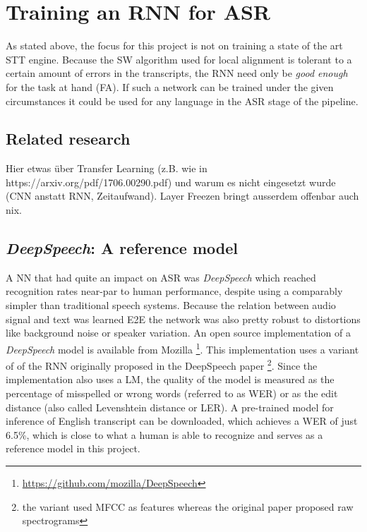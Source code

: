\section{Training an \ac{RNN} for \ac{ASR}}\label{ds}
As stated above, the focus for this project is not on training a state of the art \ac{STT} engine. Because the \ac{SW} algorithm used for local alignment is tolerant to a certain amount of errors in the transcripts, the \ac{RNN} need only be \textit{good enough} for the task at hand (\ac{FA}). If such a network can be trained under the given circumstances it could be used for any language in the \ac{ASR} stage of the pipeline. 

\subsection{Related research}

Hier etwas über Transfer Learning (z.B. wie in https://arxiv.org/pdf/1706.00290.pdf) und warum es nicht eingesetzt wurde (CNN anstatt RNN, Zeitaufwand). Layer Freezen bringt ausserdem offenbar auch nix. \parencite{budget}

\subsection{\textit{DeepSpeech}: A reference model}

A \ac{NN} that had quite an impact on \ac{ASR} was \textit{DeepSpeech} \parencite{deepspeech} which reached recognition rates near-par to human performance, despite using a comparably simpler than traditional speech systems. Because the relation between audio signal and text was learned \ac{E2E} the network was also pretty robust to distortions like background noise or speaker variation. An open source implementation of a \textit{DeepSpeech} model is available from Mozilla \footnote{\url{https://github.com/mozilla/DeepSpeech}}. This implementation uses a variant of of the \ac{RNN} originally proposed in the DeepSpeech paper \parencite{ctc_paper}\footnote{the variant used \ac{MFCC} as features whereas the original paper proposed raw spectrograms}. Since the implementation also uses a \ac{LM}, the quality of the model is measured as the percentage of misspelled or wrong words (referred to as \ac{WER}) or as the edit distance (also called Levenshtein distance or \ac{LER}). A pre-trained model for inference of English transcript can be downloaded, which achieves a \ac{WER} of just 6.5\%, which is close to what a human is able to recognize \parencite{mozillajourney} and serves as a reference model in this project.

